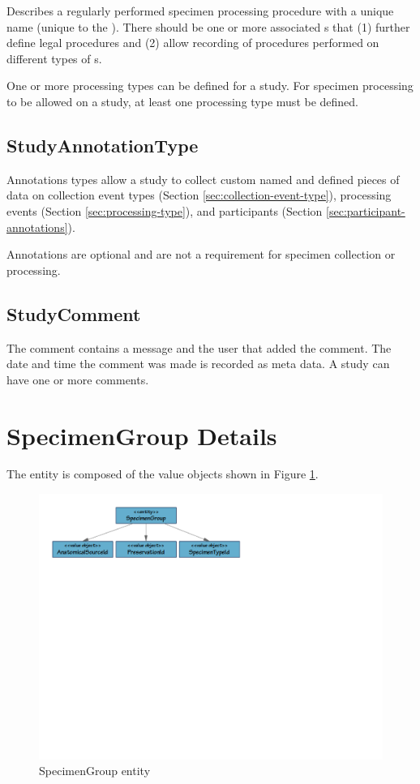 Describes a regularly performed specimen processing procedure with a unique
name (unique to the ). There should be one or more associated
s that (1) further define legal procedures and (2)
allow recording of procedures performed on different types of
s.

One or more processing types can be defined for a study. For specimen
processing to be allowed on a study, at least one processing type must be
defined.

\subsection*{StudyAnnotationType}

Annotations types allow a study to collect custom named and defined pieces of
data on collection event types (Section \ref{sec:collection-event-type}),
processing events (Section \ref{sec:processing-type}), and participants
(Section \ref{sec:participant-annotations}).

Annotations are optional and are not a requirement for specimen collection or
processing.

\subsection*{StudyComment}

The comment contains a message and the user that added the comment. The date
and time the comment was made is recorded as meta data. A study can have one or
more comments.

\section{SpecimenGroup Details}
\label{sec:specimen-group}

The  entity is composed of the value objects shown
in Figure \ref{fig:specimen-group}.

\begin{figure}[h]
  \centering
  \includegraphics[trim={9mm 162mm 80mm 9mm}, clip,
    width=1\textwidth]{images/specimen-group}
  \caption{SpecimenGroup entity}
  \label{fig:specimen-group}
\end{figure}

